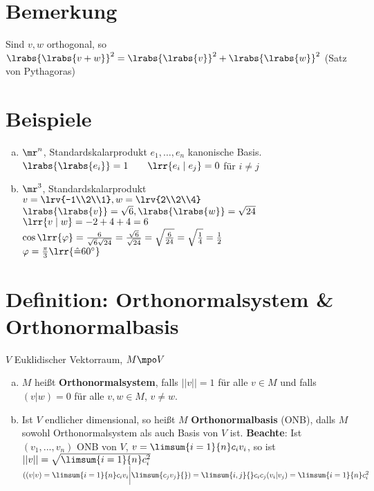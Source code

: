 \section{Bemerkung}
	Sind $v,w$ orthogonal, so $\lrabs{\lrabs{v+w}}^2=\lrabs{\lrabs{v}}^2+\lrabs{\lrabs{w}}^2$ (Satz von Pythagoras)

\section{Beispiele}
    \begin{enumerate}[a)]
	\item $\mr^n$, Standardskalarprodukt $e_1,\dots,e_n$ kanonische Basis.\\
		$\lrabs{\lrabs{e_i}}=1\qquad\lrr{e_i\mid e_j}=0$ für $i\neq j$
	\item $\mr^3$, Standardskalarprodukt\\
		$v=\lrv{-1\\2\\1}, w=\lrv{2\\2\\4}$\\
		$\lrabs{\lrabs{v}}=\sqrt{6},\lrabs{\lrabs{w}}=\sqrt{24}$\\
		$\lrr{v\mid w}=-2+4+4=6$\\
		$\cos\lrr{\varphi}=\frac{6}{\sqrt{6}\sqrt{24}}=\frac{\sqrt{6}}{\sqrt{24}}=\sqrt{\frac{6}{24}}=\sqrt{\frac{1}{4}}=\frac{1}{2}$\\
		$\varphi=\frac{\pi}{3}\lrr{\hat{=}60^\circ}$
    \end{enumerate}
\section{Definition: Orthonormalsystem \& Orthonormalbasis}
	$ V $ Euklidischer Vektorraum, $ M\mpo V $
	\begin{enumerate}[a)]
		\item $ M $ heißt \textbf{Orthonormalsystem}, falls $ ||v||=1 $ für alle $ v\in M $ und falls $ (v|w)=0 $ für alle $ v,w\in M $, $ v\neq w $.
		\item Ist $ V $ endlicher dimensional, so heißt $ M $ \textbf{Orthonormalbasis} (ONB), dalls $ M $ sowohl Orthonormalsystem als auch Basis von $ V $ ist.
      \textbf{Beachte}: Ist $ (v_1,...,v_n) $ ONB von $ V $, $ v=\limsum{i=1}{n}c_iv_i $, so ist $ ||v||=\sqrt{\limsum{i=1}{n}c_i^2} $\\
      $ ((v|v)=\limsum{i=1}{n}c_iv_i\bigg|\limsum{c_jv_j}{})=\limsum{i,j}{}c_ic_j(v_i|v_j)=\limsum{i=1}{n}c_i^2 $
	\end{enumerate}

